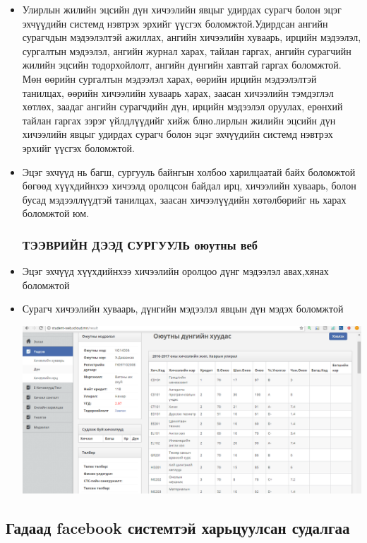 \documentclass[
oneside, %
english, %
onehalfspacing, %
nolistspacing, %
headsepline, %
]{article} %
\begin{document}
	\begin{itemize}
	\item  Улирлын жилийн эцсийн дүн хичээлийн явцыг удирдах сурагч болон эцэг эхчүүдийн системд нэвтрэх эрхийг үүсгэх боломжтой.Удирдсан ангийн сурагчдын мэдээлэлтэй ажиллах, ангийн хичээлийн хуваарь, ирцийн мэдээлэл, сургалтын мэдээлэл, ангийн журнал харах, тайлан гаргах, ангийн сурагчийн жилийн эцсийн тодорхойлолт, ангийн дүнгийн хавтгай гаргах боломжтой. Мөн өөрийн сургалтын мэдээлэл харах, өөрийн ирцийн мэдээлэлтэй танилцах, өөрийн хичээлийн хуваарь харах, заасан хичээлийн тэмдэглэл хөтлөх, заадаг ангийн сурагчдийн дүн, ирцийн мэдээлэл оруулах, ерөнхий тайлан гаргах зэрэг үйлдлүүдийг хийж блно.лирлын жилийн эцсийн дүн хичээлийн явцыг удирдах сурагч болон эцэг эхчүүдийн системд нэвтрэх эрхийг үүсгэх боломжтой.
	\item Эцэг эхчүүд нь  багш, сургууль байнгын холбоо харилцаатай байх боломжтой  бөгөөд хүүхдийнхээ хичээлд оролцсон байдал ирц, хичээлийн хуваарь, болон бусад мэдээллүүдтэй танилцах, заасан хичээлүүдийн хөтөлбөрийг нь харах боломжтой юм.
	
	\subsubsection{ТЭЭВРИЙН ДЭЭД СУРГУУЛЬ оюутны веб}
	\item Эцэг эхчүүд  хүүхдийнхээ  хичээлийн оролцоо дүнг мэдээлэл авах,хянах боломжтой
	\item Сурагч хичээлийн хуваарь, дүнгийн мэдээлэл  явцын дүн мэдэх боломжтой

	\includegraphics[width=\textwidth]{zurag}
\end{itemize}

	\subsection{Гадаад facebook системтэй харьцуулсан судалгаа}
	
\end{document}

